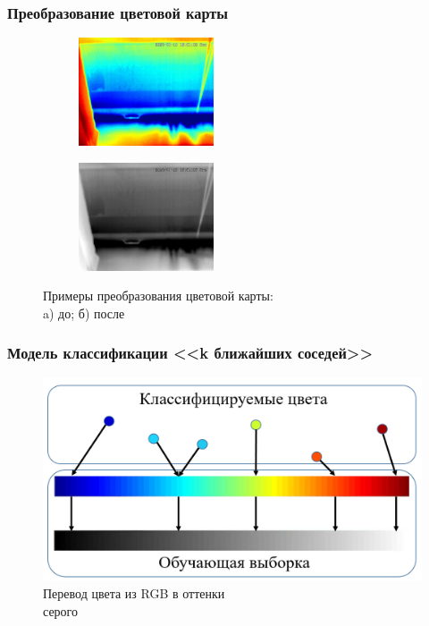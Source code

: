 \documentclass[t]{beamer}
\begin{document}
	\begin{frame}
		\frametitle{Преобразование цветовой карты}
		\vspace*{0.45cm}
		\begin{figure}[ht!]
			\begin{subfigure}{.45\textwidth}
				\centering
				\includegraphics[width = 4cm]{image/chapter_2/tep_example}
				\caption{}
			\end{subfigure}
			\begin{subfigure}{.45\textwidth}
				\centering
				\includegraphics[width = 4cm]{image/chapter_2/gray_tep_example}
				\caption{}
			\end{subfigure}
			\centering
			\caption{Примеры преобразования цветовой карты:\\ a) до; б) после}
			\label{fig:ResKNN}
		\end{figure}
	\end{frame}

	\begin{frame}
		\frametitle{Модель классификации <<k ближайших соседей>>}
		
		\vspace{0.85cm}
		\begin{figure}[h!]
			\centering
			\includegraphics[width = .8\textwidth]{image/cool_scheme}	
			\caption{Перевод цвета из RGB в оттенки\\ серого}
			\label{fig:kdtreeexample}
		\end{figure}
	\end{frame}
	
\end{document}
